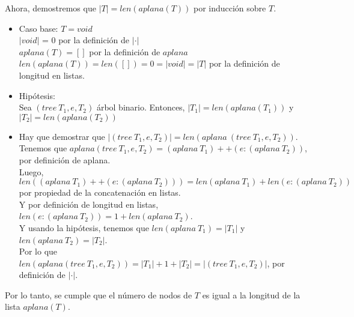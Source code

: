 \documentclass{article}
\begin{document}
\begin{enumerate}
{\begin{enumerate}
{                    
                    Ahora, demostremos que $|T| = len(aplana(T))$ por inducción 
                    sobre $T$.
                    \begin{itemize}                    
                    \item {
                        Caso base: $T = void$\\
                        $|void|$ = 0 por la definición de $|\cdot|$\\
                        $aplana(T) = []$ por la definición de $aplana$ \\
                        $len(aplana(T)) = len([]) = 0 = |void| = |T|$ por la 
                        definición de longitud en listas.
                    }
					\item {
                        Hipótesis: \\
                        Sea $(tree \ T_1, e, T_2)$ árbol binario. Entonces, 
                        $|T_1| = len(aplana(T_1))$ y $|T_2| = len(aplana(T_2))$ 
                    }
                    \item {
                        Hay que demostrar que 
                        $|(tree \ T_1, e, T_2)| = len(aplana \ (tree \ T_1, e, T_2))$.\\
                        Tenemos que $aplana(tree \ T_1, e, T_2) = 
                        (aplana \ T_1) ++ (e:(aplana \ T_2))$, por definición de 
                        aplana.\\
                        Luego, $len((aplana \ T_1) ++ (e:(aplana \ T_2))) 
                        = len(aplana \ T_1) + len(e:(aplana \ T_2))$ por 
                        propiedad de la concatenación en listas.\\
                        Y por definición de longitud en listas, 
                        $len(e:(aplana \ T_2)) = 1 + len(aplana \ T_2)$.\\
                        Y usando la hipótesis, tenemos que 
                        $len(aplana \ T_1) = |T_1|$ y $len(aplana \ T_2) = |T_2|$.\\
                        Por lo que $len(aplana (tree \ T_1, e, T_2)) 
                        = |T_1| + 1 + |T_2| = |(tree \ T_1, e, T_2)|$,
                        por definición de $|\cdot|$.
                    }
                \end{itemize}
                Por lo tanto, se cumple  que el número de nodos de $T$ es 
                igual a la longitud de la lista $aplana(T)$.
            }
                

\end{enumerate}}
\end{enumerate}
\end{document}
